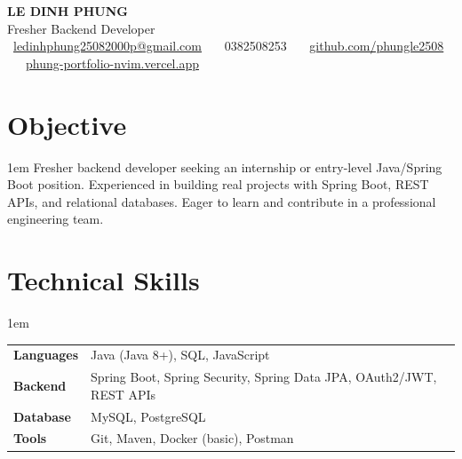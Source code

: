 \documentclass[11pt,a4paper]{article}
\begin{document}
\begin{center}
	{\LARGE\bfseries\color{maincolor} LE DINH PHUNG} \\[0.25em]
	{\normalsize\color{accentcolor} Fresher Backend Developer} \\[0.3em]
	\small
	~\href{mailto:ledinhphung25082000p@gmail.com}{ledinhphung25082000p@gmail.com}
	~~~0382508253
	~~~\href{https://github.com/phungle2508}{github.com/phungle2508}
	~~~\href{https://phung-portfolio-nvim.vercel.app/}{phung-portfolio-nvim.vercel.app}
\end{center}

\vspace{0.3em}

\section{Objective}
\begin{adjustwidth}{1em}{}
	\small
	Fresher backend developer seeking an internship or entry-level Java/Spring Boot position. Experienced in building real projects with Spring Boot, REST APIs, and relational databases. Eager to learn and contribute in a professional engineering team.
\end{adjustwidth}

\section{Technical Skills}
\begin{adjustwidth}{1em}{}
	\small
	\begin{tabular}{@{}p{2.8cm}l}
		\textbf{Languages} & Java (Java 8+), SQL, JavaScript                                      \\[0.15em]
		\textbf{Backend}   & Spring Boot, Spring Security, Spring Data JPA, OAuth2/JWT, REST APIs \\[0.15em]
		\textbf{Database}  & MySQL, PostgreSQL                                                    \\[0.15em]
		\textbf{Tools}     & Git, Maven, Docker (basic), Postman                                  \\
	\end{tabular}
\end{adjustwidth}
\end{document}
